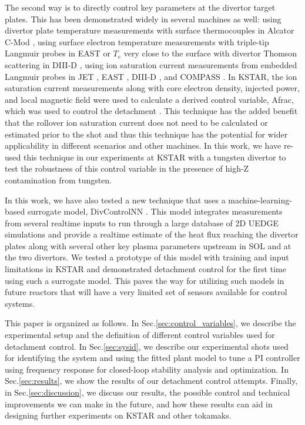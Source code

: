 The second way is to directly control key parameters at the divertor target plates.
This has been demonstrated widely in several machines as well:
using divertor plate temperature measurements with surface thermocouples in Alcator C-Mod \cite{Brunner_2017_NF},
using surface electron temperature measurements with triple-tip Langmuir probes in EAST \cite{Eldon_2021_NME} or $T_e$ very close to the surface with divertor Thomson scattering in DIII-D \cite{Eldon_2017_NF},
using ion saturation current measurements from embedded Langmuir probes in JET \cite{Guillemaut_2017_PPCF}, EAST \cite{Yuan_2020_FED}, DIII-D \cite{Eldon_2021_NME}, and COMPASS \cite{Khodunov_2021_PPCF}.
In KSTAR, the ion saturation current measurements along with core electron density, injected power, and local magnetic field were used to calculate a derived control variable, \ac{Afrac}, which was used to control the detachment \cite{Eldon_2022_PPCF}.
This technique has the added benefit that the rollover ion saturation current does not need to be calculated or estimated prior to the shot and thus this technique has the potential for wider applicability in different scenarios and other machines.
In this work, we have re-used this technique in our experiments at KSTAR with a tungsten divertor to test the robustness of this control variable in the presence of high-Z contamination from tungsten.

In this work, we have also tested a new technique that uses a machine-learning-based surrogate model, DivControlNN \cite{zhu_2025_pop}.
This model integrates measurements from several realtime inputs to run through a large database of 2D UEDGE \cite{Rognlien_1999_PP} simulations and provide a realtime estimate of the heat flux reaching the divertor plates along with several other key plasma parameters upstream in \ac{SOL} and at the two divertors.
We tested a prototype of this model with training and input limitations in KSTAR and demonstrated detachment control for the first time using such a surrogate model.
This paves the way for utilizing such models in future reactors that will have a very limited set of sensors available for control systems.

This paper is organized as follows.
In Sec.\ref{sec:control_variables}, we describe the experimental setup and the definition of different control variables used for detachment control.
In Sec.\ref{sec:sysid}, we describe our experimental shots used for identifying the system and using the fitted plant model to tune a PI controller using frequency response for closed-loop stability analysis and optimization.
In Sec.\ref{sec:results}, we show the results of our detachment control attempts.
Finally, in Sec.\ref{sec:discussion}, we discuss our results, the possible control and technical improvements we can make in the future, and how these results can aid in designing further experiments on KSTAR and other tokamaks.